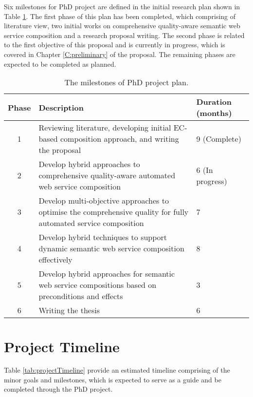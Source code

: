 Six milestones for PhD project are defined in the initial research plan shown in Table \ref{tab:projectOverview}. The first phase of this plan has been completed, which comprising of literature view, two initial works on comprehensive quality-aware semantic web service composition and a research proposal writing. The second phase is related to the first objective of this proposal and is currently in progress, which is covered in Chapter \ref{C:preliminary} of the proposal. The remaining phases are expected to be completed as planned.

\begin{table}
\small
\centering
\caption{The milestones of PhD project plan.}
\vspace{0.2cm}
\begin{tabular}{|c|p{100mm}|l|}
\hline
Phase & Description & Duration (months) \\ \hline
1 & Reviewing literature, developing initial EC-based composition approach, and writing the proposal & 9 (Complete)  \\
2 & Develop hybrid approaches to comprehensive quality-aware automated web service composition & 6 (In progress) \\
3 & Develop multi-objective approaches to optimise the comprehensive quality for fully automated service composition & 7 \\
4 & Develop hybrid techniques to support dynamic semantic web service composition effectively & 8 \\
5 & Develop hybrid approaches for semantic web service compositions based on preconditions and effects & 3 \\
6 & Writing the thesis & 6 \\ \hline
\end{tabular}
\label{tab:projectOverview}
\end{table}

\section{Project Timeline}

Table \ref{tab:projectTimeline} provide an estimated timeline comprising of the minor goals and milestones, which is expected to serve as a guide and be completed through the PhD project.

